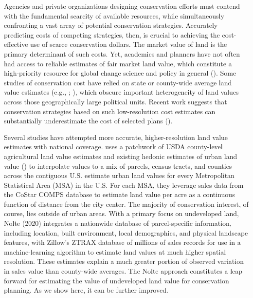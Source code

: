 \documentclass[12pt]{article}
\begin{document}
Agencies and private organizations designing conservation efforts must contend with the fundamental scarcity of available resources, while simultaneously confronting a vast array of potential conservation strategies. Accurately predicting costs of competing strategies, then, is crucial to achieving the cost-effective use of scarce conservation dollars. The market value of land is the primary determinant of such costs. Yet, academics and planners have not often had access to reliable estimates of fair market land value, which constitute a high-priority resource for global change science and policy in general (\cite{Coomes2018GeospatialPolicy}). Some studies of conservation cost have relied on state or county-wide average land value estimates (e.g., \cite{Withey2012MaximisingUSA}; \cite{Lawler2020PlanningConfiguration}),
which obscure important heterogeneity of land values across those geographically large political units. Recent work suggests that conservation strategies based on such low-resolution cost estimates can substantially underestimate the cost of selected plans (\cite{Nolte2020High-resolutionStates}). 

Several studies have attempted more accurate, higher-resolution land value estimates with national coverage. \textcite{Larson2015} uses a patchwork of USDA county-level agricultural land value estimates and existing hedonic estimates of urban land value (\cite{Kuminoff2013}) to interpolate values to a mix of parcels, census tracts, and counties across the contiguous U.S. \textcite{Albouy2018} estimate urban land values for every Metropolitan Statistical Area (MSA) in the U.S. For each MSA, they leverage sales data from the CoStar COMPS database to estimate land value per acre as a continuous function of distance from the city center. The majority of conservation interest, of course, lies outside of urban areas. With a primary focus on undeveloped land, Nolte (2020) integrates a nationwide database of parcel-specific information, including location, built environment, local demographics, and physical landscape features, with Zillow’s ZTRAX database of millions of sales records for use in a machine-learning algorithm to estimate land values at much higher spatial resolution. These estimates explain a much greater portion of observed variation in sales value than county-wide averages. The Nolte approach constitutes a leap forward for estimating the value of undeveloped land value for conservation planning. As we show here, it can be further improved.
\end{document}
